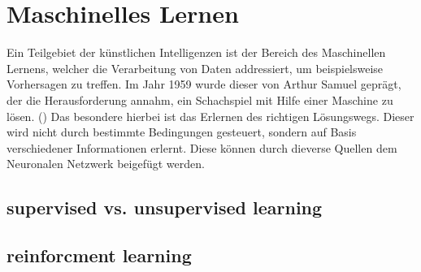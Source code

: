 \section{Maschinelles Lernen} \label{chpt:Stand_der_Technik_Maschinelles_Lernen}
Ein Teilgebiet der künstlichen Intelligenzen ist der Bereich des Maschinellen Lernens, welcher die Verarbeitung von Daten addressiert, um beispielsweise Vorhersagen zu treffen.
Im Jahr 1959 wurde dieser von Arthur Samuel geprägt, der die Herausforderung annahm, ein Schachspiel mit Hilfe einer Maschine zu lösen. (\cite[4]{lorenz_reinforcement_2020})
Das besondere hierbei ist das Erlernen des richtigen Lösungswegs. Dieser wird nicht durch bestimmte Bedingungen gesteuert, sondern auf Basis verschiedener Informationen erlernt. 
Diese können durch dieverse Quellen dem Neuronalen Netzwerk beigefügt werden.
\subsection{supervised vs. unsupervised learning}
\subsection{reinforcment learning}